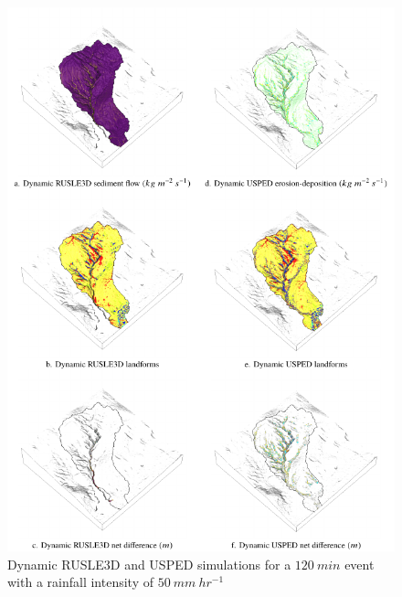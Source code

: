 \documentclass[esurf, manuscript]{copernicus}
\begin{document}
\begin{figure}%
\center
\includegraphics[width=\textwidth,height=0.925\textheight,keepaspectratio]{figures/simulations.pdf}
\caption{Dynamic RUSLE3D and USPED simulations
for a $120~min$ event with a rainfall intensity of $50~mm~hr^{-1}$}
\label{fig:simulations}
\end{figure}
\end{document}
